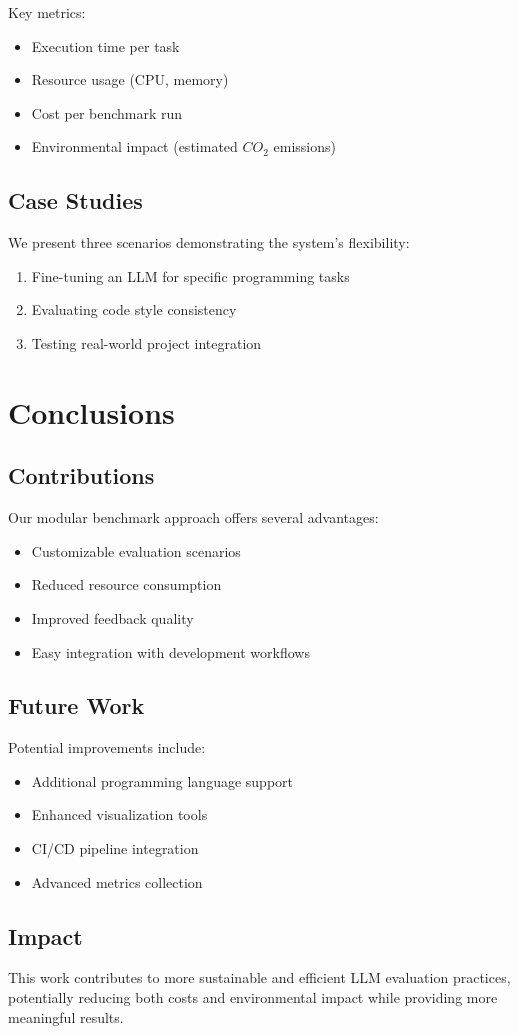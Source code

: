 Key metrics:
\begin{itemize}
    \item Execution time per task
    \item Resource usage (CPU, memory)
    \item Cost per benchmark run
    \item Environmental impact (estimated $CO_2$ emissions)
\end{itemize}

\section{Case Studies}

We present three scenarios demonstrating the system's flexibility:
\begin{enumerate}
    \item Fine-tuning an LLM for specific programming tasks
    \item Evaluating code style consistency
    \item Testing real-world project integration
\end{enumerate}

\chapter{Conclusions}

\section{Contributions}

Our modular benchmark approach offers several advantages:
\begin{itemize}
    \item Customizable evaluation scenarios
    \item Reduced resource consumption
    \item Improved feedback quality
    \item Easy integration with development workflows
\end{itemize}

\section{Future Work}

Potential improvements include:
\begin{itemize}
    \item Additional programming language support
    \item Enhanced visualization tools
    \item CI/CD pipeline integration
    \item Advanced metrics collection
\end{itemize}

\section{Impact}

This work contributes to more sustainable and efficient LLM evaluation practices, potentially reducing both costs and environmental impact while providing more meaningful results.
